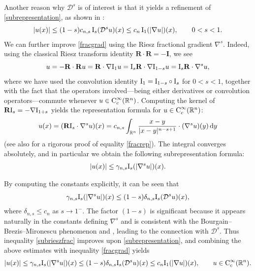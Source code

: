\documentclass[11pt, a4paper, reqno]{amsart}
\newcommand{\ra}{\rightarrow}
\newcommand{\R}{\mathbb R}
\newcommand{\D}{\mathcal D}
\newcommand{\Con}{\textup{C}}
\theoremstyle{definition}
\theoremstyle{remark}
\begin{document}
Another reason why $\mathcal D^s$ is of interest is that it yields a refinement of \eqref{subrepresentation}, as shown in \cite[Lemma 2.6]{HMP1}:
\begin{equation}\label{fracgrad}
|u(x)|
\leq
(1-s)c_{n,s}\,\textup I_s(\mathcal D^s u)(x)
\leq
c_n \,\textup I_1(|\nabla u|)(x),
\qquad 0<s<1.
\end{equation}
We can further improve \eqref{fracgrad} using the Riesz fractional gradient $\nabla^s$. Indeed, using the classical Riesz transform identity $\mathbf R \cdot \mathbf R = -\mathbf I$, we see
\[
u
=
- \mathbf R \cdot \mathbf R u
=
\mathbf R \cdot \nabla \textup I_1 u
=
\textup I_s \mathbf R \cdot \nabla \textup I_{1-s} u
=
\textup I_s \mathbf R \cdot \nabla^s u,
\]
where we have used the convolution identity $\textup I_1 = \textup I_{1-s} \circ \textup I_s$ for $0<s<1$, together with the fact that the operators involved—being either derivatives or convolution operators—commute whenever $u \in \Con_c^\infty(\mathbb R^n)$. Computing the kernel of $\mathbf R\textup I_s=-\nabla \textup I_{1+s}$ yields the representation formula for $u\in \Con_c^\infty(\R^n)$:
\begin{equation}\label{fracrep}
u(x)=({\mathbf R}\textup I_s \cdot \nabla^s u)(x)
=c_{n,s}
\int_{\R^n}\frac{x-y}{|x-y|^{n-s+1}}\cdot(\nabla^s u)(y)\,\mathrm{d}y
\end{equation}
(see also \cite[Proposition 15.8, p.~246]{Ponce} for a rigorous proof of equality \eqref{fracrep}). The integral converges absolutely, and in particular we obtain the following subrepresentation formula:
\begin{equation}\label{subrieszfrac}
|u(x)|\leq \gamma_{n,s}\textup I_s(|\nabla^s u|)(x).
\end{equation}

By computing the constants explicitly, it can be seen that
\[
\gamma_{n,s}\textup I_s(|\nabla^s u|)(x)
\leq (1-s)\delta_{n,s}\textup I_s(\D^s u)(x),
\]
where $\delta_{n,s}\leq c_n$ as $s\ra 1^-$. The factor $(1-s)$ is significant because it appears naturally in the constants defining $\nabla^s$ and is consistent with the Bourgain--Brezis--Mironescu phenomenon \cite{BBM1} and \cite{BBM2}, leading to the connection with $\D^s$. Thus inequality \eqref{subrieszfrac} improves upon \eqref{subrepresentation}, and combining the above estimates with inequality \eqref{fracgrad} yields
\[
|u(x)|
\leq \gamma_{n,s}\textup I_s(|\nabla^s u|)(x)
\leq (1-s)\delta_{n,s} \textup I_s(\D^s u)(x)
\leq c_n\textup I_1(|\nabla u|)(x),
\qquad u\in \Con_c^\infty(\R^n).
\]
\end{document}

